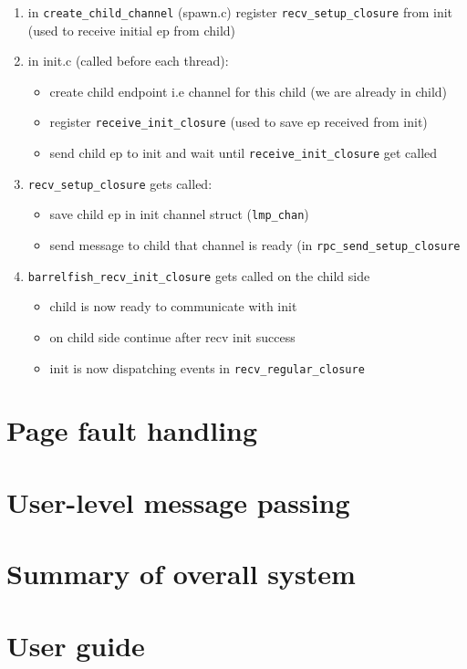 \documentclass[11pt,a4paper]{report}
\begin{document}
\begin{enumerate}
    \item in \verb|create_child_channel| (spawn.c) register
    \verb|recv_setup_closure| from init
    (used to receive initial ep from child)

    \item in init.c (called before each thread): 
        \begin{itemize}
            \item create child endpoint i.e channel for this child (we are already in child)
            \item register \verb|receive_init_closure| (used to save ep received from init)
            \item send child ep to init and wait until
            \verb|receive_init_closure| get called
        \end{itemize}
    \item \verb|recv_setup_closure| gets called:
        \begin{itemize} 
            \item save child ep in init channel struct (\verb|lmp_chan|)
            \item send message to child that channel is ready (in
            \verb|rpc_send_setup_closure|
        \end{itemize}
    \item \verb|barrelfish_recv_init_closure| gets called on the child side
        \begin{itemize}
            \item child is now ready to communicate with init
            \item on child side continue after recv init success
            \item init is now dispatching events in \verb|recv_regular_closure|
        \end{itemize}
\end{enumerate}

\chapter{Page fault handling}




\chapter{User-level message passing}









\chapter{Summary of overall system}

\appendix

\chapter{User guide}

\printbibliography
\end{document}
